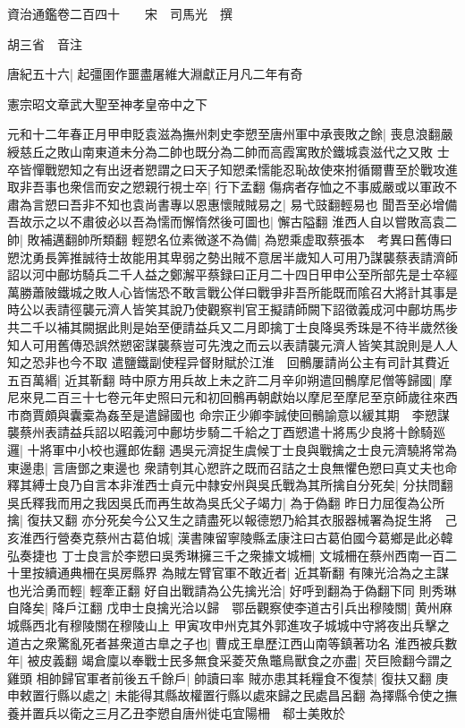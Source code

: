 資治通鑑卷二百四十　　宋　司馬光　撰

胡三省　音注

唐紀五十六|{
	起彊圉作噩盡屠維大淵獻正月凡二年有奇}


憲宗昭文章武大聖至神孝皇帝中之下

元和十二年春正月甲申貶袁滋為撫州刺史李愬至唐州軍中承喪敗之餘|{
	喪息浪翻嚴綬慈丘之敗山南東道未分為二帥也既分為二帥而高霞寓敗於鐵城袁滋代之又敗}
士卒皆憚戰愬知之有出迓者愬謂之曰天子知愬柔懦能忍恥故使來拊循爾曹至於戰攻進取非吾事也衆信而安之愬親行視士卒|{
	行下孟翻}
傷病者存恤之不事威嚴或以軍政不肅為言愬曰吾非不知也袁尚書專以恩惠懷賊賊易之|{
	易弋豉翻輕易也}
聞吾至必增備吾故示之以不肅彼必以吾為懦而懈惰然後可圖也|{
	懈古隘翻}
淮西人自以嘗敗高袁二帥|{
	敗補邁翻帥所類翻}
輕愬名位素微遂不為備|{
	為愬乘虚取蔡張本　考異曰舊傳曰愬沈勇長筭推誠待士故能用其卑弱之勢出賊不意居半歲知人可用乃謀襲蔡表請濟師詔以河中鄜坊騎兵二千人益之鄭澥平蔡録曰正月二十四日甲申公至所部先是士卒經萬勝蕭陂鐵城之敗人心皆惴恐不敢言戰公佯曰戰爭非吾所能既而隂召大將計其事是時公以表請徑襲元濟人皆笑其說乃使觀察判官王擬請師闕下詔徵義成河中鄜坊馬步共二千以補其闕据此則是始至便請益兵又二月即擒丁士良降吳秀珠是不待半歲然後知人可用舊傳恐誤然愬密謀襲蔡豈可先洩之而云以表請襲元濟人皆笑其說則是人人知之恐非也今不取}
遣鹽鐵副使程异督財賦於江淮　回鶻屢請尚公主有司計其費近五百萬緡|{
	近其靳翻}
時中原方用兵故上未之許二月辛卯朔遣回鶻摩尼僧等歸國|{
	摩尼來見二百三十七卷元年史照曰元和初回鶻再朝獻始以摩尼至摩尼至京師歲往來西市商賈頗與囊槖為姦至是遣歸國也}
命宗正少卿李誠使回鶻諭意以緩其期　李愬謀襲蔡州表請益兵詔以昭義河中鄜坊步騎二千給之丁酉愬遣十將馬少良將十餘騎廵邏|{
	十將軍中小校也邏郎佐翻}
遇吳元濟捉生虞候丁士良與戰擒之士良元濟驍將常為東邊患|{
	言唐鄧之東邊也}
衆請刳其心愬許之既而召詰之士良無懼色愬曰真丈夫也命釋其縛士良乃自言本非淮西士貞元中隸安州與吳氏戰為其所擒自分死矣|{
	分扶問翻}
吳氏釋我而用之我因吳氏而再生故為吳氏父子竭力|{
	為于偽翻}
昨日力屈復為公所擒|{
	復扶又翻}
亦分死矣今公又生之請盡死以報德愬乃給其衣服器械署為捉生將　己亥淮西行營奏克蔡州古葛伯城|{
	漢書陳留寧陵縣孟康注曰古葛伯國今葛鄉是此必韓弘奏捷也}
丁士良言於李愬曰吳秀琳擁三千之衆據文城柵|{
	文城柵在蔡州西南一百二十里按續通典柵在吳房縣界}
為賊左臂官軍不敢近者|{
	近其靳翻}
有陳光洽為之主謀也光洽勇而輕|{
	輕牽正翻}
好自出戰請為公先擒光洽|{
	好呼到翻為于偽翻下同}
則秀琳自降矣|{
	降戶江翻}
戊申士良擒光洽以歸　鄂岳觀察使李道古引兵出穆陵關|{
	黄州麻城縣西北有穆陵關在穆陵山上}
甲寅攻申州克其外郭進攻子城城中守將夜出兵擊之道古之衆驚亂死者甚衆道古臯之子也|{
	曹成王臯歷江西山南等鎮著功名}
淮西被兵數年|{
	被皮義翻}
竭倉廩以奉戰士民多無食采菱芡魚鼈鳥獸食之亦盡|{
	芡巨險翻今謂之雞頭}
相帥歸官軍者前後五千餘戶|{
	帥讀曰率}
賊亦患其耗糧食不復禁|{
	復扶又翻}
庚申敕置行縣以處之|{
	未能得其縣故權置行縣以處來歸之民處昌呂翻}
為擇縣令使之撫養并置兵以衛之三月乙丑李愬自唐州徙屯宜陽柵　郗士美敗於

